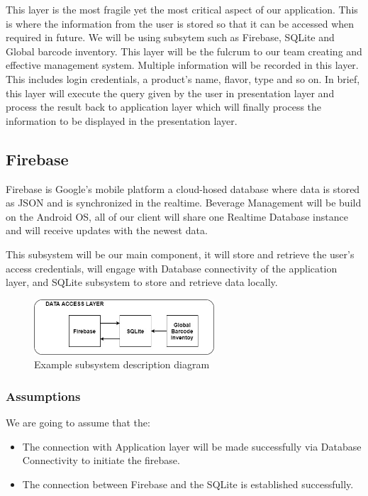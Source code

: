 This layer is the most fragile yet the most critical aspect of our application. This is where the information from the user is stored so that it can be accessed when required in future. We will be using subsytem such as Firebase, SQLite and Global barcode inventory. This layer will be the fulcrum to our team creating and effective management system. Multiple information will be recorded in this layer. This includes login credentials, a product’s name, flavor, type and so on. In brief, this layer will execute the query given by the user in presentation layer and process the result back to application layer which will finally process the information to be displayed in the presentation layer.

\subsection{Firebase}
Firebase is Google's mobile platform a cloud-hosed database where data is stored as JSON and is synchronized in the realtime. Beverage Management will be build on the Android OS, all of our client will share one Realtime Database instance and will receive updates with the newest data.

This subsystem will be our main component, it will store and retrieve the user's access credentials, will engage with Database connectivity of the application layer, and SQLite subsystem to store and retrieve data locally. 

\begin{figure}[h!]
	\centering
 	\includegraphics[width=0.60\textwidth]{images/DS.jpg}
 \caption{Example subsystem description diagram}
\end{figure}

\subsubsection{Assumptions}
We are going to assume that the:
\begin{itemize}
    \item The connection with Application layer will be made successfully via Database Connectivity to initiate the firebase. 
    \item The connection between Firebase and the SQLite is established successfully. 
\end{itemize}

